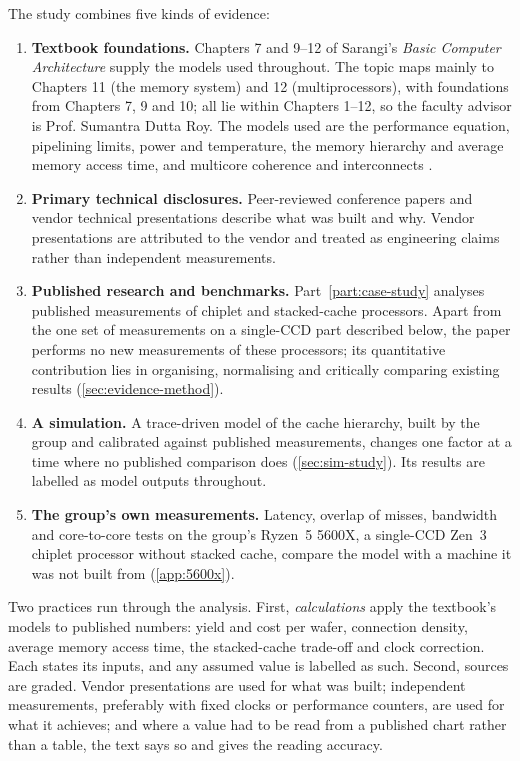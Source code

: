 The study combines five kinds of evidence:

\begin{enumerate}
  \item \textbf{Textbook foundations.} Chapters 7 and 9--12 of Sarangi's \emph{Basic Computer Architecture} supply the models used throughout. The topic maps mainly to Chapters 11 (the memory system) and 12 (multiprocessors), with foundations from Chapters 7, 9 and 10; all lie within Chapters 1--12, so the faculty advisor is Prof. Sumantra Dutta Roy. The models used are the performance equation, pipelining limits, power and temperature, the memory hierarchy and average memory access time, and multicore coherence and interconnects \cite{sarangi2025basic}.
  \item \textbf{Primary technical disclosures.} Peer-reviewed conference papers and vendor technical presentations describe what was built and why. Vendor presentations are attributed to the vendor and treated as engineering claims rather than independent measurements.
  \item \textbf{Published research and benchmarks.} Part~\ref{part:case-study} analyses published measurements of chiplet and stacked-cache processors. Apart from the one set of measurements on a single-CCD part described below, the paper performs no new measurements of these processors; its quantitative contribution lies in organising, normalising and critically comparing existing results (\cref{sec:evidence-method}).
  \item \textbf{A simulation.} A trace-driven model of the cache hierarchy, built by the group and calibrated against published measurements, changes one factor at a time where no published comparison does (\cref{sec:sim-study}). Its results are labelled as model outputs throughout.
  \item \textbf{The group's own measurements.} Latency, overlap of misses, bandwidth and core-to-core tests on the group's Ryzen~5 5600X, a single-CCD Zen~3 chiplet processor without stacked cache, compare the model with a machine it was not built from (\cref{app:5600x}).
\end{enumerate}

Two practices run through the analysis. First, \emph{calculations} apply the textbook's models to published numbers: yield and cost per wafer, connection density, average memory access time, the stacked-cache trade-off and clock correction. Each states its inputs, and any assumed value is labelled as such. Second, sources are graded. Vendor presentations are used for what was built; independent measurements, preferably with fixed clocks or performance counters, are used for what it achieves; and where a value had to be read from a published chart rather than a table, the text says so and gives the reading accuracy.

